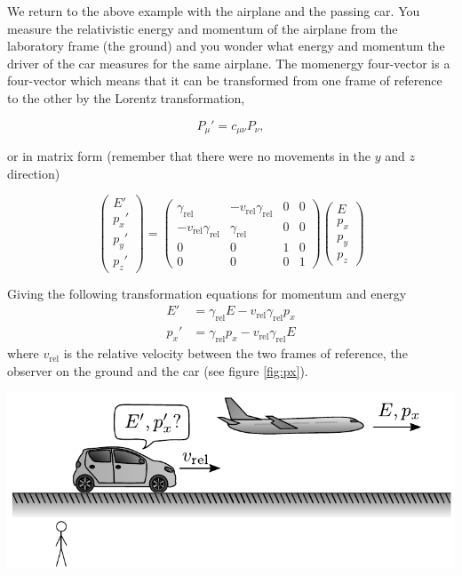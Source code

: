 {\begin{multicols}{2}
We return to the above example with the airplane and the passing car. You measure the relativistic energy and momentum of the airplane from the laboratory frame (the ground) and you wonder what energy and momentum the driver of the car measures for the same airplane. The momenergy four-vector is a four-vector which means that it can be transformed from one frame of reference to the other by the Lorentz transformation,
\begin{formbox}
\[
P_\mu'=c_{\mu\nu}P_\nu,
\]
\end{formbox}
or in matrix form (remember that there were no movements in the $y$ and $z$ direction)
\begin{formbox}
\[
\begin{pmatrix}
E'\\
p_x'\\
p_y'\\
p_z'
\end{pmatrix}
=
\begin{pmatrix}
\gamma_\mathrm{rel}&-v_\mathrm{rel}\gamma_\mathrm{rel}&0&0\\
-v_\mathrm{rel}\gamma_\mathrm{rel}&\gamma_\mathrm{rel}&0&0\\
0&0&1&0\\
0&0&0&1
\end{pmatrix}
\begin{pmatrix}
E\\
p_x\\
p_y\\
p_z
\end{pmatrix}
\]
\end{formbox}

Giving the following transformation equations for momentum and energy
\begin{align*}
E'&=\gamma_\mathrm{rel}E-v_\mathrm{rel}\gamma_\mathrm{rel}p_x\\
p_x'&=\gamma_\mathrm{rel}p_x-v_\mathrm{rel}\gamma_\mathrm{rel}E
\end{align*}
where $v_\mathrm{rel}$ is the relative velocity between the two frames of reference, the observer on the ground and the car (see figure \ref{fig:px}). 

\begin{Figure}%
\centering
\includegraphics[width=\textwidth]{fig_9-4.pdf}
\end{Figure}




\end{multicols}}
